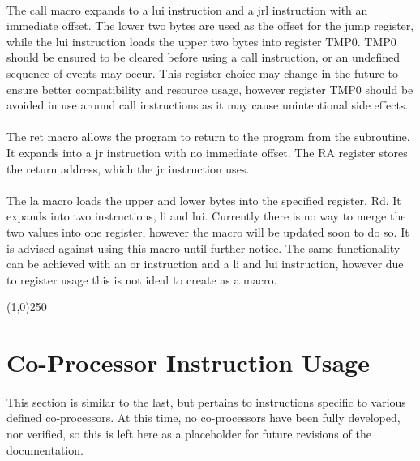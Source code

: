 \documentclass[letterpaper, 11pt]{article}
\begin{document}
\paragraph{} The call macro expands to a lui instruction and a jrl instruction with an immediate offset. The lower two bytes
are used as the offset for the jump register, while the lui instruction loads the upper two bytes into register TMP0. 
TMP0 should be ensured to be cleared before using a call instruction, or an undefined sequence of events may occur.
This register choice may change in the future to ensure better compatibility and resource usage, however register TMP0 should
be avoided in use around call instructions as it may cause unintentional side effects. 

\paragraph{} The ret macro allows the program to return to the program from the subroutine. It expands into a jr instruction
with no immediate offset. The RA register stores the return address, which the jr instruction uses. 

\paragraph{} The la macro loads the upper and lower bytes into the specified register, Rd. It expands into two instructions,
li and lui. Currently there is no way to merge the two values into one register, however the macro will be updated soon to do so.
It is advised against using this macro until further notice. The same functionality can be achieved with an or instruction and
a li and lui instruction, however due to register usage this is not ideal to create as a macro.
\begin{center}
	\line(1,0){250}
\end{center}

\clearpage
\section{Co-Processor Instruction Usage}
\paragraph{}This section is similar to the last, but pertains to instructions specific to various defined co-processors. At this time,
no co-processors have been fully developed, nor verified, so this is left here as a placeholder for future revisions of the documentation.
\end{document}
